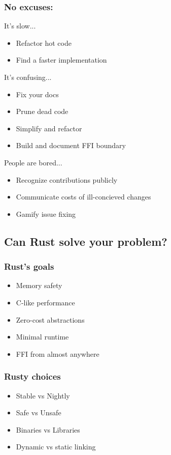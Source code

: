 \documentclass{beamer}
\begin{document}
\begin{frame}[fragile]
\frametitle{No excuses:}
It's slow...
\begin{itemize}
\item Refactor hot code
\item Find a faster implementation
\end{itemize}
It's confusing...
\begin{itemize}
\item Fix your docs
\item Prune dead code
\item Simplify and refactor
\item Build and document FFI boundary
\end{itemize}
People are bored...
\begin{itemize}
\item Recognize contributions publicly
\item Communicate costs of ill-concieved changes
\item Gamify issue fixing
\end{itemize}
\end{frame}

\subsection{Can Rust solve your problem?}

\begin{frame}[fragile]
\frametitle{Rust's goals}
\begin{itemize}
\item Memory safety
\item C-like performance
\item Zero-cost abstractions
\item Minimal runtime
\item FFI from almost anywhere
\end{itemize}
\end{frame}

\begin{frame}[fragile]
\frametitle{Rusty choices}
\begin{itemize}
\item Stable vs Nightly
\item Safe vs Unsafe
\item Binaries vs Libraries
\item Dynamic vs static linking
\end{itemize}
\end{frame}
\end{document}
